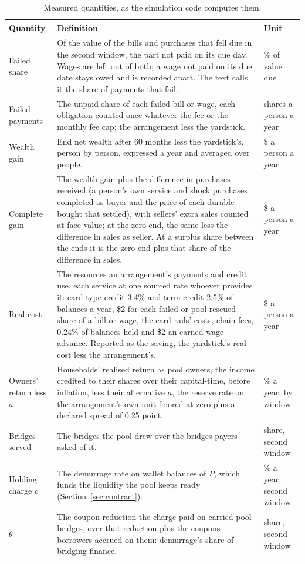 \begin{table}[ht]
\centering\small
\caption{Measured quantities, as the simulation code computes them.}
\label{tab:outcomes}
\begin{tabularx}{\textwidth}{@{}l X l@{}}
\toprule
Quantity & Definition & Unit \\
\midrule
Failed share & Of the value of the bills and purchases that fell due in the second window, the part not paid on
  its due day. Wages are left out of both; a wage not paid on its due date stays owed and is recorded apart. The
  text calls it the share of payments that fail. & \% of value due \\
Failed payments & The unpaid share of each failed bill or wage, each obligation counted once whatever the fee or
  the monthly fee cap; the arrangement less the yardstick. & shares a person a year \\
Wealth gain & End net wealth after 60 months less the yardstick's, person by person, expressed a year and averaged
  over people. & \$ a person a year \\
Complete gain & The wealth gain plus the difference in purchases received (a person's own service and shock
  purchases completed as buyer and the price of each durable bought that settled), with sellers' extra sales counted
  at face value; at the zero end, the same less the difference in sales as seller. At a surplus share between the
  ends it is the zero end plus that share of the difference in sales. & \$ a person a year \\
Real cost & The resources an arrangement's payments and credit use, each service at one sourced rate whoever
  provides it: card-type credit 3.4\% and term credit 2.5\% of balances a year, \$2 for each failed or pool-rescued
  share of a bill or wage, the card rails' costs, chain fees, 0.24\% of balances held and \$2 an earned-wage
  advance. Reported as the saving, the yardstick's real cost less the arrangement's. & \$ a person a year \\
Owners' return less $a$ & Households' realised return as pool owners, the income credited to
  their shares over their capital-time, before inflation, less their alternative $a$, the reserve rate on the
  arrangement's own unit floored at zero plus a declared spread of 0.25 point. & \% a year, by window \\
Bridges served & The bridges the pool drew over the bridges payers asked of it. & share, second window \\
Holding charge $c$ & The demurrage rate on wallet balances of $P$, which funds the liquidity the pool keeps ready
  (Section~\ref{sec:contract}). & \% a year, second window \\
$\theta$ & The coupon reduction the charge paid on carried pool bridges, over that reduction plus the coupons
  borrowers accrued on them: demurrage's share of bridging finance. & share, second window \\
\bottomrule
\end{tabularx}
\end{table}

